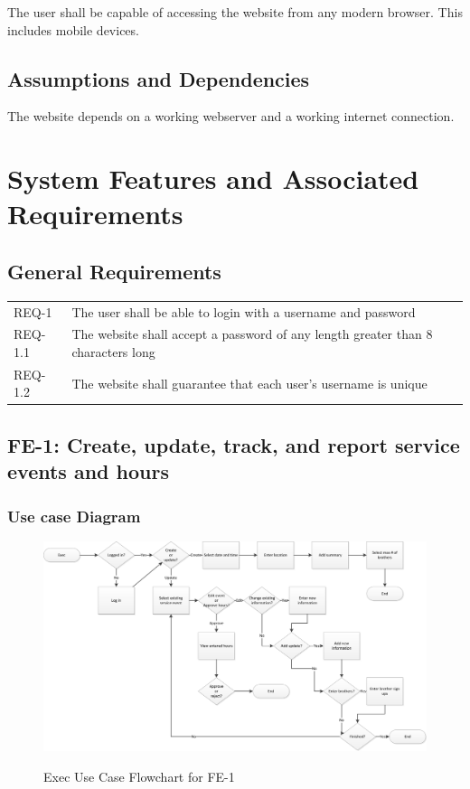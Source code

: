 \documentclass{article}
\newcommand{\req}[1]{REQ-{#1}}
\begin{document}
The user shall be capable of accessing the website from any modern
browser. This includes mobile devices.

\subsection{Assumptions and Dependencies}

The website depends on a working webserver and a working internet
connection.

\section{System Features and Associated Requirements}

\subsection{General Requirements}

\begin{tabular}{lp{8cm}}
\req{1} & The user shall be able to login with a username and password\\
\req{1.1} & The website shall accept a password of any length greater than 8 characters long\\
\req{1.2} & The website shall guarantee that each user's username is
unique\\
\end{tabular}

\subsection{FE-1: Create, update, track, and report service events and
  hours}

\subsubsection{Use case Diagram}

\newpage

\FloatBarrier
\begin{figure}
\centering
\caption{Exec Use Case Flowchart for FE-1}
\includegraphics[scale=.75]{img/execUseCaseFE1.png}
\label{fig:execUseCaseFE1}
\end{figure}
\FloatBarrier
\end{document}
